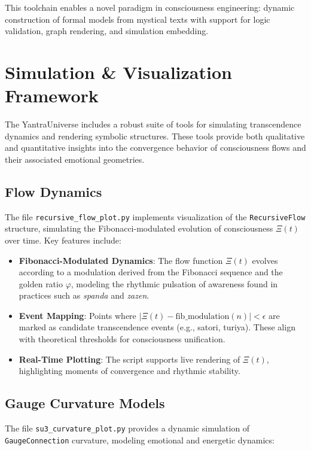 \documentclass[12pt]{article}
\theoremstyle{plain}
\begin{document}
This toolchain enables a novel paradigm in consciousness engineering: dynamic construction of formal models from mystical texts with support for logic validation, graph rendering, and simulation embedding.

\section{Simulation \& Visualization Framework}

The YantraUniverse includes a robust suite of tools for simulating transcendence dynamics and rendering symbolic structures. These tools provide both qualitative and quantitative insights into the convergence behavior of consciousness flows and their associated emotional geometries.

\subsection{Flow Dynamics}

The file \texttt{recursive\_flow\_plot.py} implements visualization of the \texttt{RecursiveFlow} structure, simulating the Fibonacci-modulated evolution of consciousness $\Xi(t)$ over time. Key features include:

\begin{itemize}
  \item \textbf{Fibonacci-Modulated Dynamics}: The flow function $\Xi(t)$ evolves according to a modulation derived from the Fibonacci sequence and the golden ratio $\varphi$, modeling the rhythmic pulsation of awareness found in practices such as \textit{spanda} and \textit{zazen}.
  \item \textbf{Event Mapping}: Points where $|\Xi(t) - \text{fib\_modulation}(n)| < \epsilon$ are marked as candidate transcendence events (e.g., satori, turiya). These align with theoretical thresholds for consciousness unification.
  \item \textbf{Real-Time Plotting}: The script supports live rendering of $\Xi(t)$, highlighting moments of convergence and rhythmic stability.
\end{itemize}

\subsection{Gauge Curvature Models}

The file \texttt{su3\_curvature\_plot.py} provides a dynamic simulation of \texttt{GaugeConnection} curvature, modeling emotional and energetic dynamics:
\end{document}
